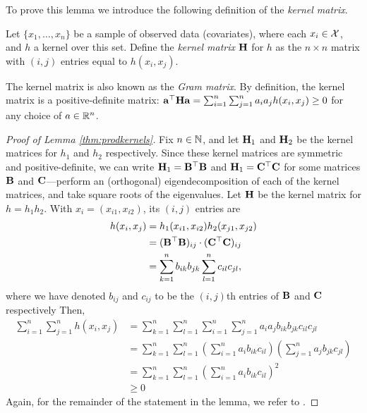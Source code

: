 To prove this lemma we introduce the following definition of the \emph{kernel matrix}.

\begin{definition}
  Let $\{x_1,\dots,x_n\}$ be a sample of observed data (covariates), where each $x_i\in{\mathcal X}$, and $h$ a kernel over this set.
  Define the \emph{kernel matrix} ${\mathbf H}$ for $h$ as the $n \times n$ matrix with $(i,j)$ entries equal to $h(x_i,x_j)$.
\end{definition}

The kernel matrix is also known as the \emph{Gram matrix}.
By definition, the kernel matrix is a positive-definite matrix: ${\mathbf a}^\top{\mathbf H}{\mathbf a} = \sum_{i=1}^n\sum_{j=1}^n a_ia_jh(x_i,x_j) \geq 0$ for any choice of $a\in\mathbb{R}^n$.

\begin{proof}[Proof of Lemma \ref{thm:prodkernels}]
  Fix $n\in\mathbb{N}$, and let ${\mathbf H}_1$ and ${\mathbf H}_2$ be the kernel matrices for $h_1$ and $h_2$ respectively.
  Since these kernel matrices are symmetric and positive-definite, we can write ${\mathbf H}_1 = {\mathbf B}^\top{\mathbf B}$ and ${\mathbf H}_1 = {\mathbf C}^\top{\mathbf C}$ for some matrices ${\mathbf B}$ and ${\mathbf C}$---perform an (orthogonal) eigendecomposition of each of the kernel matrices, and take square roots of the eigenvalues.
  Let ${\mathbf H}$ be the kernel matrix for $h = h_1h_2$.
  With $x_i = (x_{i1}, x_{i2})$, its $(i,j)$ entries are
  \begin{align*}
    h(x_i,x_j)
    &=h_1(x_{i1},x_{i2}) h_2(x_{j1},x_{j2}) \\
    &= ({\mathbf B}^\top{\mathbf B})_{ij}\cdot ({\mathbf C}^\top{\mathbf C})_{ij} \\
    &= \sum_{k=1}^n b_{ik}b_{jk} \sum_{l=1}^n c_{il}c_{jl},
  \end{align*}
  where we have denoted $b_{ij}$ and $c_{ij}$ to be the $(i,j)$th entries of ${\mathbf B}$ and ${\mathbf C}$ respectively 
  Then,
  \begin{align*}
    \sum_{i=1}^n\sum_{j=1}^n h(x_i,x_j)
    &= \sum_{k=1}^n \sum_{l=1}^n \sum_{i=1}^n \sum_{j=1}^n  a_ia_jb_{ik}b_{jk}c_{il}c_{jl} \\
    &= \sum_{k=1}^n \sum_{l=1}^n \left(\sum_{i=1}^n a_i b_{ik} c_{il} \right) \left( \sum_{j=1}^n  a_jb_{jk}c_{jl} \right) \\
    &= \sum_{k=1}^n \sum_{l=1}^n \left(\sum_{i=1}^n a_i b_{ik} c_{il} \right)^2 \\
    &\geq 0
  \end{align*}
  Again, for the remainder of the statement in the lemma, we refer to \citet[Theorem 13]{berlinet2011reproducing}.
\end{proof}

